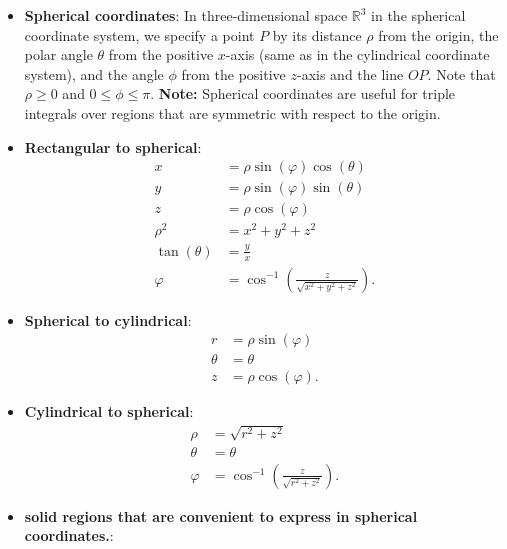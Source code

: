 \documentclass{report}
\begin{document}
\begin{itemize}
        \item \textbf{Spherical coordinates}:
            In three-dimensional space \(\mathbb{R}^3\) in the spherical coordinate system, we specify a point \(P\) by its distance \(\rho\) from the origin, the polar angle \(\theta\) from the positive \(x\)-axis (same as in the cylindrical coordinate system), and the angle \(\phi\) from the positive \(z\)-axis and the line \(OP\). Note that \(\rho \geq 0\) and \(0 \leq \phi \leq \pi\).
            \bigbreak \noindent 
            \bigbreak \noindent 
            \textbf{Note:} Spherical coordinates are useful for triple integrals over regions that are symmetric with respect to the origin.
    \item \textbf{Rectangular to spherical}:
        \begin{align*}
            x &= \rho\sin{\left(\varphi\right)}\cos{\left(\theta \right)} \\
            y &= \rho\sin{\left(\varphi\right)}\sin{\left(\theta \right)} \\
            z &= \rho\cos{\left(\varphi\right)} \\
            \rho^{2} &= x^{2} + y^{2} + z^{2} \\
            \tan{\left(\theta \right)} &= \frac{y}{x} \\
            \varphi &= \cos^{-1}{\left(\frac{z}{\sqrt{x^{2} + y^{2} + z^{2}}}\right)}
        .\end{align*}
    \item \textbf{Spherical to cylindrical}:
        \begin{align*}
            r &= \rho\sin{\left(\varphi\right)} \\
            \theta  &= \theta  \\
            z &= \rho\cos{\left(\varphi\right)} 
        .\end{align*}
    \item \textbf{Cylindrical to spherical}:
        \begin{align*}
            \rho &= \sqrt{r^{2} + z^{2}} \\
            \theta  &= \theta  \\
            \varphi &= \cos^{-1}{\left(\frac{z}{\sqrt{r^{2} + z^{2}}}\right)}
        .\end{align*}
    \item \textbf{solid regions that are convenient to express in spherical coordinates.}:
        \bigbreak \noindent 

\end{itemize}
\end{document}
